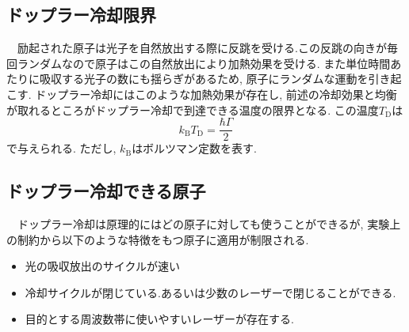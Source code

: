 \documentclass[uplatex, dvipdfmx, a4paper, report, papersize, 11pt]{jsbook}
\begin{document}
\subsection{ドップラー冷却限界}
　励起された原子は光子を自然放出する際に反跳を受ける.この反跳の向きが毎回ランダムなので原子はこの自然放出により加熱効果を受ける. また単位時間あたりに吸収する光子の数にも揺らぎがあるため, 原子にランダムな運動を引き起こす.
ドップラー冷却にはこのような加熱効果が存在し, 前述の冷却効果と均衡が取れるところがドップラー冷却で到達できる温度の限界となる. この温度$T _ { \mathrm { D } }$は
\begin{equation}
  k _ { \mathrm { B } } T _ { \mathrm { D } } = \frac { \hbar \Gamma } { 2 }
\end{equation}
で与えられる. ただし, $k _ { \mathrm { B } }$はボルツマン定数を表す.
\subsection{ドップラー冷却できる原子}
　ドップラー冷却は原理的にはどの原子に対しても使うことができるが, 実験上の制約から以下のような特徴をもつ原子に適用が制限される\cite{ノーベル賞と分光学}.
\begin{itemize}
  \item 光の吸収放出のサイクルが速い
  \item 冷却サイクルが閉じている.あるいは少数のレーザーで閉じることができる.
  \item 目的とする周波数帯に使いやすいレーザーが存在する.
\end{itemize}

\newpage
\end{document}

